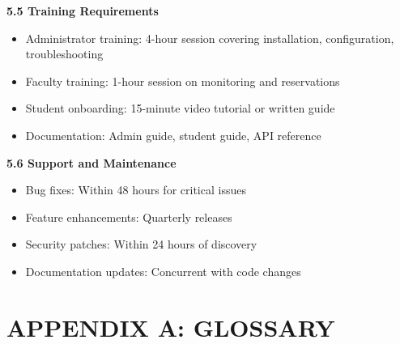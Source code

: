 \documentclass[12pt,a4paper]{article}
\begin{document}
\textbf{5.5 Training Requirements}

\begin{itemize}[noitemsep]
    \item Administrator training: 4-hour session covering installation, configuration, troubleshooting
    \item Faculty training: 1-hour session on monitoring and reservations
    \item Student onboarding: 15-minute video tutorial or written guide
    \item Documentation: Admin guide, student guide, API reference
\end{itemize}

\textbf{5.6 Support and Maintenance}

\begin{itemize}[noitemsep]
    \item Bug fixes: Within 48 hours for critical issues
    \item Feature enhancements: Quarterly releases
    \item Security patches: Within 24 hours of discovery
    \item Documentation updates: Concurrent with code changes
\end{itemize}

\section*{APPENDIX A: GLOSSARY}
\end{document}
